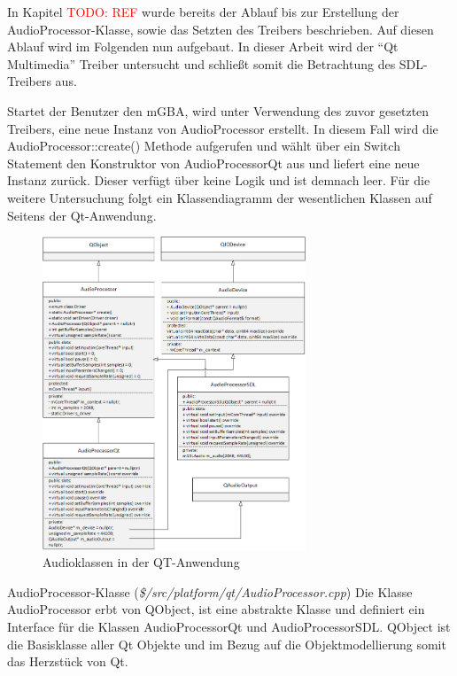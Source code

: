 \documentclass[11pt,a4paper]{scrartcl}
\begin{document}
In Kapitel  \textcolor{red}{ TODO: REF} wurde bereits der Ablauf bis zur Erstellung der AudioProcessor-Klasse, sowie das Setzten des Treibers beschrieben. Auf diesen Ablauf wird im Folgenden nun aufgebaut. In dieser Arbeit
wird der \enquote{Qt Multimedia} Treiber untersucht und schlie{\ss}t somit die Betrachtung des SDL-Treibers aus.

Startet der Benutzer den mGBA, wird unter Verwendung des zuvor gesetzten Treibers, eine neue Instanz von AudioProcessor erstellt. In diesem Fall wird die AudioProcessor::create() Methode aufgerufen und w\"ahlt \"uber ein Switch Statement den Konstruktor von AudioProcessorQt aus und liefert eine neue Instanz zur\"uck. Dieser verf\"ugt \"uber keine Logik und ist demnach leer. F\"ur die weitere Untersuchung folgt ein Klassendiagramm der wesentlichen Klassen auf Seitens der Qt-Anwendung.

\begin{figure}[h!]
    \centering
    \includegraphics[width=0.7\textwidth]{QT_Klassendiagramm}
    \caption{Audioklassen in der QT-Anwendung}
    \label{fig:qtclassdiagramm}
\end{figure}

\newpage

\vspace{5mm}
\large AudioProcessor-Klasse \normalsize(\textit{\$/src/platform/qt/AudioProcessor.cpp})
\vspace{2mm}\newline
Die Klasse AudioProcessor erbt von QObject, ist eine abstrakte Klasse und definiert ein Interface f\"ur die Klassen AudioProcessorQt und AudioProcessorSDL. QObject ist die Basisklasse aller Qt Objekte und im Bezug auf
die Objektmodellierung somit das Herzst\"uck von Qt. 
\end{document}
